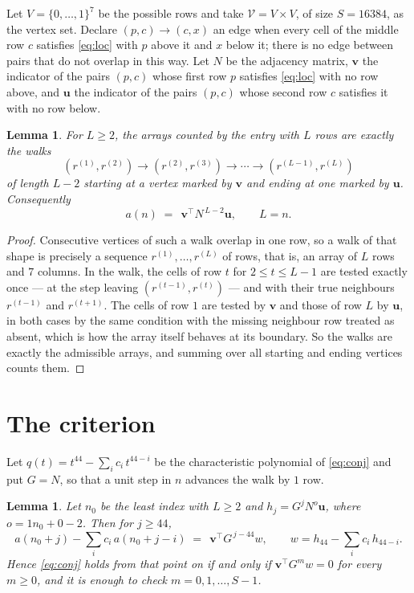 \documentclass[11pt,a4paper]{article}
\theoremstyle{plain}
\newtheorem{lemma}[theorem]{Lemma}
\theoremstyle{definition}
\begin{document}
Let $V=\{0,\dots,1\}^{7}$ be the possible rows and take
$\mathcal V=V\times V$, of size $S=16384$, as the vertex set. Declare $(p,c)\to(c,x)$ an edge
when every cell of the middle row $c$ satisfies \eqref{eq:loc} with $p$ above it and $x$
below it; there is no edge between pairs that do not overlap in this way. Let $N$ be the
adjacency matrix, $\mathbf{v}$ the indicator of the pairs $(p,c)$ whose first row $p$
satisfies \eqref{eq:loc} with no row above, and $\mathbf{u}$ the indicator of
the pairs $(p,c)$ whose second row $c$ satisfies it with no row below.

\begin{lemma}\label{lem:walk}
For $L\ge2$, the arrays counted by the entry with $L$ rows are exactly the walks
\[
(r^{(1)},r^{(2)})\to(r^{(2)},r^{(3)})\to\cdots\to(r^{(L-1)},r^{(L)})
\]
of length $L-2$ starting at a vertex marked by $\mathbf{v}$ and ending at one marked by
$\mathbf{u}$. Consequently
\[
a(n)\;=\;\,\mathbf{v}^{\!\top}N^{\,L-2}\mathbf{u},\qquad L=n .
\]
\end{lemma}

\begin{proof}
Consecutive vertices of such a walk overlap in one row, so a walk of that shape is
precisely a sequence $r^{(1)},\dots,r^{(L)}$ of rows, that is, an array of $L$ rows
and $7$ columns. In the walk, the cells of row $t$ for $2\le t\le L-1$ are tested
exactly once --- at the step leaving $(r^{(t-1)},r^{(t)})$ --- and with their true
neighbours $r^{(t-1)}$ and $r^{(t+1)}$. The cells of row $1$ are tested by
$\mathbf{v}$ and those of row $L$ by $\mathbf{u}$, in both cases by the same condition
with the missing neighbour row treated as absent, which is how the array itself behaves at
its boundary. So the walks are exactly the admissible arrays, and summing over all starting
and ending vertices counts them.
\end{proof}

\section{The criterion}

Let $q(t)=t^{44}-\sum_i c_i\,t^{44-i}$ be the characteristic polynomial of
\eqref{eq:conj} and put $G=N$, so that a unit step in $n$ advances the walk by
$1$ row.

\begin{lemma}\label{lem:crit}
Let $n_0$ be the least index with $L\ge2$ and $h_j=G^{j}N^{o}\mathbf{u}$, where
$o=1n_0+0-2$. Then for $j\ge44$,
\[
a(n_0+j)-\sum_i c_i\,a(n_0+j-i)\;=\;\,\mathbf{v}^{\!\top}G^{\,j-44}w,
\qquad w=h_{44}-\sum_i c_i\,h_{44-i} .
\]
Hence \eqref{eq:conj} holds from that point on if and only if
$\mathbf{v}^{\!\top}G^{m}w=0$ for every $m\ge0$, and it is enough to check
$m=0,1,\dots,S-1$.
\end{lemma}
\end{document}
